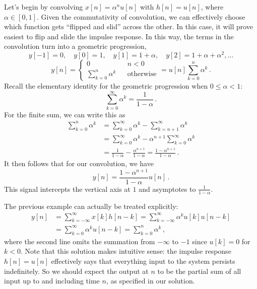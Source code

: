 %
\begin{exmp}
  Let's begin by convolving $x[n] = \alpha^n u[n]$ with $h[n] = u[n]$, where
  $\alpha\in [0,1]$. Given the commutativity of convolution, we can effectively
  choose which function gets ``flipped and slid'' across the other. In this case,
  it will prove easiest to flip and slide the impulse response. In this way, the terms
  in the convolution turn into a geometric progression,
  \begin{displaymath}
    y[-1] = 0, \quad y[0] = 1, \quad y[1] = 1 + \alpha, \quad y[2] = 1 + \alpha + \alpha^2, \hdots
  \end{displaymath}
  \begin{equation}
    y[n] = \left\{\begin{array}{ccl}
    0 & & n < 0 \\
    \sum_{k=0}^n \alpha^k & & \mathrm{otherwise}
    \end{array}\right. = u[n]\sum_{k=0}^n \alpha^k \,.
  \end{equation}
  Recall the elementary identity for the geometric progression when $0\leq\alpha< 1$:
  \begin{displaymath}
    \sum_{k=0}^\infty \alpha^k = \frac{1}{1 - \alpha} \,.
  \end{displaymath}
  For the finite sum, we can write this as
  \begin{align*}
    \sum_{k=0}^n \alpha^k &= \sum_{k=0}^\infty \alpha^k - \sum_{k=n+1}^\infty \alpha^k \\
    &= \sum_{k=0}^\infty \alpha^k - \alpha^{n+1}\sum_{k=0}^\infty \alpha^k \\
    &= \frac{1}{1-\alpha} - \frac{\alpha^{n+1}}{1-\alpha} = \frac{1 - \alpha^{n+1}}{1 - \alpha} \,.
  \end{align*}
  It then follows that for our convolution, we have
  \begin{equation}
    y[n] = \frac{1 - \alpha^{n+1}}{1 - \alpha} u[n] \,.
  \end{equation}
  This signal intercepts the vertical axis at $1$ and asymptotes to $\frac{1}{1-\alpha}$.
\end{exmp}
%
\begin{exmp}
  The previous example can actually be treated explicitly:
  \begin{align*}
    y[n] &= \sum_{k=-\infty}^\infty x[k]h[n-k] = \sum_{k=-\infty}^\infty \alpha^k u[k] u[n-k] \\
    &= \sum_{k=0}^\infty \alpha^k u[n-k] = \sum_{k=0}^n \alpha^k \,,
  \end{align*}
  where the second line omits the summation from $-\infty$ to $-1$ since $u[k] = 0$ for $k < 0$.
  Note that this solution makes intuitive sense: the impulse response $h[n] = u[n]$ effectively
  says that everything input to the system persists indefinitely. So we should expect the
  output at $n$ to be the partial sum of all input up to and including time $n$, as
  specified in our solution.
\end{exmp}
